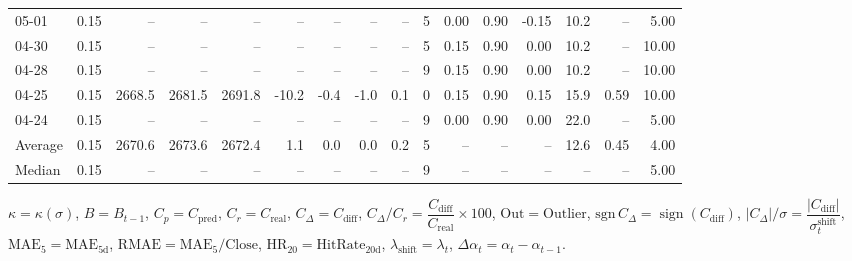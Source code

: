 \begin{threeparttable}
{\begin{tabular}{lrrrrrrrrrrrrrrr}
  05-01 &     0.15 &     -- &     -- &     -- &         -- &             -- &                       -- &                  -- &              5 &       0.00 &      0.90 &          -0.15 &             10.2 &              -- &                   5.00 \\
  04-30 &     0.15 &     -- &     -- &     -- &         -- &             -- &                       -- &                  -- &              5 &       0.15 &      0.90 &           0.00 &             10.2 &              -- &                  10.00 \\
  04-28 &     0.15 &     -- &     -- &     -- &         -- &             -- &                       -- &                  -- &              9 &       0.15 &      0.90 &           0.00 &             10.2 &              -- &                  10.00 \\
  04-25 &     0.15 & 2668.5 & 2681.5 & 2691.8 &      -10.2 &           -0.4 &                     -1.0 &                 0.1 &              0 &       0.15 &      0.90 &           0.15 &             15.9 &            0.59 &                  10.00 \\
  04-24 &     0.15 &     -- &     -- &     -- &         -- &             -- &                       -- &                  -- &              9 &       0.00 &      0.90 &           0.00 &             22.0 &              -- &                   5.00 \\
Average &     0.15 & 2670.6 & 2673.6 & 2672.4 &        1.1 &            0.0 &                      0.0 &                 0.2 &              5 &         -- &        -- &             -- &             12.6 &            0.45 &                   4.00 \\
 Median &     0.15 &     -- &     -- &     -- &         -- &             -- &                       -- &                  -- &              9 &         -- &        -- &             -- &               -- &              -- &                   5.00 \\
\bottomrule
\end{tabular}
}
\begin{tablenotes}\footnotesize
\item $\kappa=\kappa(\sigma)$, $B=B_{t-1}$, $C_p=C_{\text{pred}}$, $C_r=C_{\text{real}}$, $C_\Delta=C_{\text{diff}}$, $C_\Delta/C_r=\dfrac{C_{\text{diff}}}{C_{\text{real}}}\times100$, $\mathrm{Out}=\text{Outlier}$, $\mathrm{sgn}\,C_\Delta=\operatorname{sign}(C_{\text{diff}})$, $|C_\Delta|/\sigma=\dfrac{|C_{\text{diff}}|}{\sigma_t^{\text{shift}}}$, $\mathrm{MAE}_5=\mathrm{MAE}_{5\text{d}}$, $\mathrm{RMAE}= \mathrm{MAE}_5 / \text{Close}$, $\mathrm{HR}_{20}=\mathrm{HitRate}_{20\text{d}}$, 
$\lambda_{\text{shift}}=\lambda_t$, 
$\Delta\alpha_t=\alpha_t-\alpha_{t-1}$.
\end{tablenotes}
\end{threeparttable}
\endgroup

